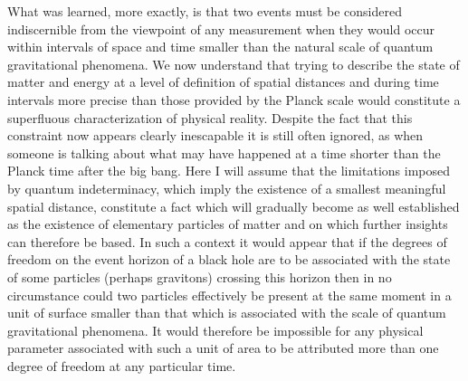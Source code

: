 \documentclass[notitlepage,12pt]{report}
\begin{document}
What was learned, more exactly, is that two events must be considered indiscernible from the viewpoint of any measurement when they would occur within intervals of space and time smaller than the natural scale of quantum gravitational phenomena. We now understand that trying to describe the state of matter and energy at a level of definition of spatial distances and during time intervals more precise than those provided by the Planck scale would constitute a superfluous characterization of physical reality. Despite the fact that this constraint now appears clearly inescapable it is still often ignored, as when someone is talking about what may have happened at a time shorter than the Planck time after the big bang. Here I will assume that the limitations imposed by quantum indeterminacy, which imply the existence of a smallest meaningful spatial distance, constitute a fact which will gradually become as well established as the existence of elementary particles of matter and on which further insights can therefore be based. In such a context it would appear that if the degrees of freedom on the event horizon of a black hole are to be associated with the state of some particles (perhaps gravitons) crossing this horizon then in no circumstance could two particles effectively be present at the same moment in a unit of surface smaller than that which is associated with the scale of quantum gravitational phenomena. It would therefore be impossible for any physical parameter associated with such a unit of area to be attributed more than one degree of freedom at any particular time.
\end{document}
